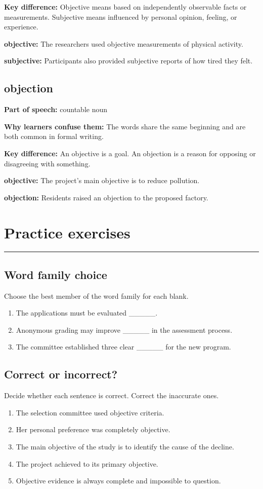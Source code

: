 \documentclass[11pt]{article}
\newcommand{\sectionrule}{\par\vspace{-0.5em}\noindent\textcolor{Accent}{\rule{\linewidth}{0.6pt}}\par}
\begin{document}
\textbf{Key difference:} Objective means based on independently observable facts or measurements. Subjective means influenced by personal opinion, feeling, or experience.

\textbf{objective:} The researchers used objective measurements of physical activity.

\textbf{subjective:} Participants also provided subjective reports of how tired they felt.

\subsection{objection}
\textbf{Part of speech:} countable noun

\textbf{Why learners confuse them:} The words share the same beginning and are both common in formal writing.

\textbf{Key difference:} An objective is a goal. An objection is a reason for opposing or disagreeing with something.

\textbf{objective:} The project's main objective is to reduce pollution.

\textbf{objection:} Residents raised an objection to the proposed factory.

\section{Practice exercises}
\sectionrule
\subsection{Word family choice}
Choose the best member of the word family for each blank.

\begin{enumerate}
  \item The applications must be evaluated \_\_\_\_\_.
  \item Anonymous grading may improve \_\_\_\_\_ in the assessment process.
  \item The committee established three clear \_\_\_\_\_ for the new program.
\end{enumerate}

\subsection{Correct or incorrect?}
Decide whether each sentence is correct. Correct the inaccurate ones.

\begin{enumerate}
  \item The selection committee used objective criteria.
  \item Her personal preference was completely objective.
  \item The main objective of the study is to identify the cause of the decline.
  \item The project achieved to its primary objective.
  \item Objective evidence is always complete and impossible to question.
\end{enumerate}
\end{document}
